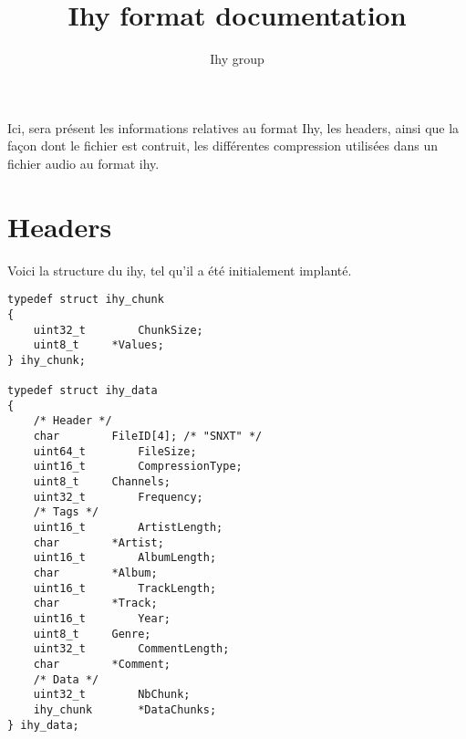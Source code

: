 \documentclass[a4paper,12pt]{article}
\title{Ihy format documentation}
\author{Ihy group}
\begin{document}
\maketitle

\abstract
Ici, sera présent les informations relatives au format Ihy, les headers, ainsi
que la façon dont le fichier est contruit, les différentes compression
utilisées dans un fichier audio au format ihy.

\tableofcontents

\section{Headers}

Voici la structure du ihy, tel qu'il a été initialement implanté.

\lstset{language=c, numbers=left}
\begin{lstlisting}[frame=single]
typedef struct ihy_chunk
{
    uint32_t		ChunkSize;
    uint8_t		*Values;
} ihy_chunk;

typedef struct ihy_data
{
    /* Header */
    char		FileID[4]; /* "SNXT" */
    uint64_t		FileSize;
    uint16_t		CompressionType;
    uint8_t		Channels;
    uint32_t		Frequency;
    /* Tags */
    uint16_t		ArtistLength;
    char		*Artist;
    uint16_t		AlbumLength;
    char		*Album;
    uint16_t		TrackLength;
    char		*Track;
    uint16_t		Year;
    uint8_t		Genre;
    uint32_t		CommentLength;
    char		*Comment;
    /* Data */
    uint32_t		NbChunk;
    ihy_chunk		*DataChunks;
} ihy_data;
\end{lstlisting}
\end{document}
